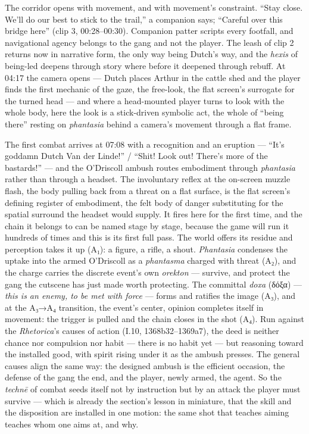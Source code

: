 \documentclass{article}
\newcommand{\gk}[1]{{\greekfont #1}}
\begin{document}
The corridor opens with movement, and with movement's constraint. ``Stay close. We'll do our best to stick to the trail,'' a companion says; ``Careful over this bridge here'' (clip 3, 00:28–00:30). Companion patter scripts every footfall, and navigational agency belongs to the gang and not the player. The leash of clip 2 returns now in narrative form, the only way being Dutch's way, and the \textit{hexis} of being-led deepens through story where before it deepened through rebuff. At 04:17 the camera opens — Dutch places Arthur in the cattle shed and the player finds the first mechanic of the gaze, the free-look, the flat screen's surrogate for the turned head — and where a head-mounted player turns to look with the whole body, here the look is a stick-driven symbolic act, the whole of ``being there'' resting on \textit{phantasia} behind a camera's movement through a flat frame.

The first combat arrives at 07:08 with a recognition and an eruption — ``It's goddamn Dutch Van der Linde!'' / ``Shit! Look out! There's more of the bastards!'' — and the O'Driscoll ambush routes embodiment through \textit{phantasia} rather than through a headset. The involuntary reflex at the on-screen muzzle flash, the body pulling back from a threat on a flat surface, is the flat screen's defining register of embodiment, the felt body of danger substituting for the spatial surround the headset would supply. It fires here for the first time, and the chain it belongs to can be named stage by stage, because the game will run it hundreds of times and this is its first full pass. The world offers its residue and perception takes it up (A₁): a figure, a rifle, a shout. \textit{Phantasia} condenses the uptake into the armed O'Driscoll as a \textit{phantasma} charged with threat (A₂), and the charge carries the discrete event's own \textit{orekton} — survive, and protect the gang the cutscene has just made worth protecting. The committal \textit{doxa} (\gk{δόξα}) — \textit{this is an enemy, to be met with force} — forms and ratifies the image (A₃), and at the A₃→A₄ transition, the event's center, opinion completes itself in movement: the trigger is pulled and the chain closes in the shot (A₄). Run against the \textit{Rhetorica}'s causes of action (I.10, 1368b32--1369a7), the deed is neither chance nor compulsion nor habit — there is no habit yet — but reasoning toward the installed good, with spirit rising under it as the ambush presses. The general causes align the same way: the designed ambush is the efficient occasion, the defense of the gang the end, and the player, newly armed, the agent. So the \textit{technē} of combat seeds itself not by instruction but by an attack the player must survive — which is already the section's lesson in miniature, that the skill and the disposition are installed in one motion: the same shot that teaches aiming teaches whom one aims at, and why.
\end{document}
